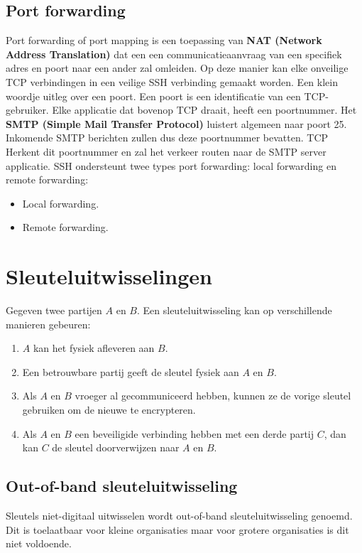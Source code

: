 \documentclass{report}
\begin{document}
	\subsection{Port forwarding}
	Port forwarding of port mapping is een toepassing van \textbf{NAT (Network Address Translation)} dat een een communicatieaanvraag van een specifiek adres en poort naar een ander zal omleiden. Op deze manier kan elke onveilige TCP verbindingen in een veilige SSH verbinding gemaakt worden. Een klein woordje uitleg over een poort. Een poort is een identificatie van een TCP-gebruiker. Elke applicatie dat bovenop TCP draait, heeft een poortnummer. Het \textbf{SMTP (Simple Mail Transfer Protocol)} luistert algemeen naar poort 25. Inkomende SMTP berichten zullen dus deze poortnummer bevatten. TCP Herkent dit poortnummer en zal het verkeer routen naar de SMTP server applicatie. SSH ondersteunt twee types port forwarding: local forwarding en remote forwarding:
	\begin{itemize}
		\item {Local forwarding.}
		\item {Remote forwarding.}
	\end{itemize}

	\section{Sleuteluitwisselingen}
	Gegeven twee partijen $A$ en $B$. Een sleuteluitwisseling kan op verschillende manieren gebeuren:
	\begin{enumerate}
		\item $A$ kan het fysiek afleveren aan $B$.
		\item Een betrouwbare partij geeft de sleutel fysiek aan $A$ en $B$.
		\item Als $A$ en $B$ vroeger al gecommuniceerd hebben, kunnen ze de vorige sleutel gebruiken om de nieuwe te encrypteren.
		\item Als $A$ en $B$ een beveiligide verbinding hebben met een derde partij $C$, dan kan $C$ de sleutel doorverwijzen naar $A$ en $B$.
	\end{enumerate}
	\subsection{Out-of-band sleuteluitwisseling}
	Sleutels niet-digitaal uitwisselen wordt out-of-band sleuteluitwisseling genoemd. Dit is toelaatbaar voor kleine organisaties maar voor grotere organisaties is dit niet voldoende.
\end{document}
